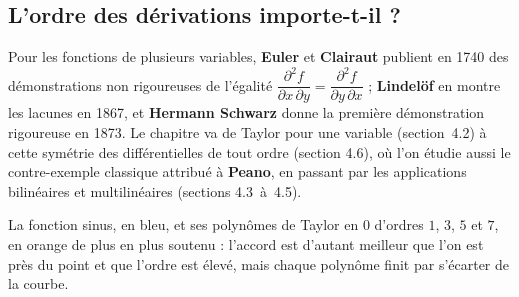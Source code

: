 \documentclass[a4paper,twoside]{report}
\begin{document}
\subsection{L'ordre des dérivations importe-t-il ?}

Pour les fonctions de plusieurs variables, \textbf{Euler} et \textbf{Clairaut} publient en 1740 des démonstrations non rigoureuses de l'égalité $\dfrac{\partial^{2} f}{\partial x\,\partial y} = \dfrac{\partial^{2} f}{\partial y\,\partial x}$ ; \textbf{Lindelöf} en montre les lacunes en 1867, et \textbf{Hermann Schwarz} donne la première démonstration rigoureuse en 1873. Le chapitre va de Taylor pour une variable (section~4.2) à cette symétrie des différentielles de tout ordre (section 4.6), où l'on étudie aussi le contre-exemple classique attribué à \textbf{Peano}, en passant par les applications bilinéaires et multilinéaires (sections 4.3~à~4.5).

\vfill
\begin{center}
\end{center}

\noindent La fonction sinus, en bleu, et ses polynômes de Taylor en $0$ d'ordres $1$, $3$, $5$ et $7$, en orange de plus en plus soutenu : l'accord est d'autant meilleur que l'on est près du point et que l'ordre est élevé, mais chaque polynôme finit par s'écarter de la courbe.
\vfill
\newpage
\end{document}
